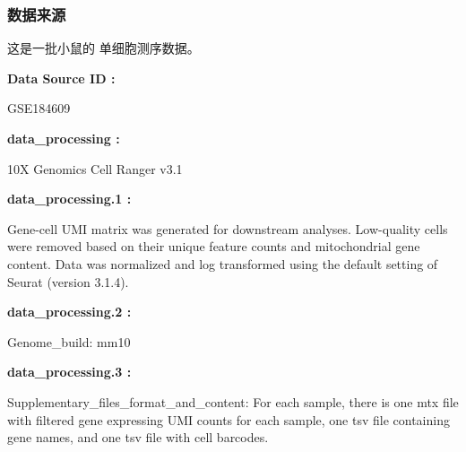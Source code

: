 \documentclass[
]{article}
\begin{document}
\hypertarget{ux6570ux636eux6765ux6e90}{%
\subsubsection{数据来源}\label{ux6570ux636eux6765ux6e90}}

这是一批小鼠的 单细胞测序数据。

\begin{center}\begin{tcolorbox}[colback=gray!10, colframe=gray!50, width=0.9\linewidth, arc=1mm, boxrule=0.5pt]
\textbf{
Data Source ID
:}

\vspace{0.5em}

    GSE184609

\vspace{2em}


\textbf{
data\_processing
:}

\vspace{0.5em}

    10X Genomics Cell Ranger v3.1

\vspace{2em}


\textbf{
data\_processing.1
:}

\vspace{0.5em}

    Gene-cell UMI matrix was generated for downstream
analyses. Low-quality cells were removed based on their
unique feature counts and mitochondrial gene content. Data
was normalized and log transformed using the default
setting of Seurat (version 3.1.4).

\vspace{2em}


\textbf{
data\_processing.2
:}

\vspace{0.5em}

    Genome\_build: mm10

\vspace{2em}


\textbf{
data\_processing.3
:}

\vspace{0.5em}

    Supplementary\_files\_format\_and\_content: For each
sample, there is one mtx file with filtered gene expressing
UMI counts for each sample, one tsv file containing gene
names, and one tsv file with cell barcodes.

\vspace{2em}
\end{tcolorbox}
\end{center}
\end{document}
